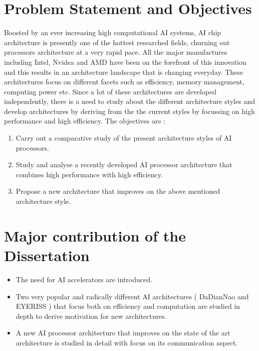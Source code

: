 \documentclass[10pt]{report}
\begin{document}
\section{Problem Statement and Objectives}
Boosted by an ever increasing high computational AI systems, AI chip architecture is presently one of the hottest researched fields, churning out processors architecture at a very rapid pace. All the major manufactures including Intel, Nvidea and AMD have been on the forefront of this innovation and this results in an architecture landscape that is changing everyday.  These architectures focus on different facets such as efficiency, memory management, computing power etc. Since a lot of these architectures are developed independently, there is a need to study about the different architecture styles and develop architectures by deriving from the the current styles by focussing on high performance and high efficiency.
The objectives are :
 \begin{enumerate}

 	\item Carry out a comparative study of the present architecture styles of AI processors.
 	\item Study and analyse a recently developed AI processor architecture that combines high performance with high efficiency.
 	\item Propose a new architecture that improves on the above mentioned architecture style.
 	  
 \end{enumerate}
   
\section{Major contribution of the Dissertation}
 
\begin{itemize}


\item The need for AI accelerators are introduced.
  
\item Two very popular and radically different AI architectures ( DaDianNao and EYERISS ) that focus both on efficiency and computation are studied in depth to derive motivation for new architectures.

\item A new AI processor architecture that improves on the state of the art architecture is studied in detail with focus on its communication aspect.

\end{itemize}
\end{document}
